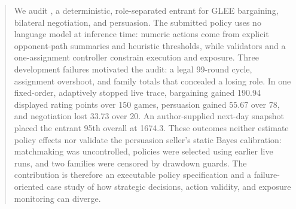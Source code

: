 \begin{abstract}
We audit \AgentName, a deterministic, role-separated entrant for GLEE
bargaining, bilateral negotiation, and persuasion. The submitted policy uses no
language model at inference time: numeric actions come from explicit
opponent-path summaries and heuristic thresholds, while validators and a
one-assignment controller constrain execution and exposure. Three development
failures motivated the audit: a legal 99-round cycle, assignment overshoot, and
family totals that concealed a losing role. In one fixed-order, adaptively
stopped live trace, bargaining gained 190.94 displayed rating points over 150
games, persuasion gained 55.67 over 78, and negotiation lost 33.73 over 20.
An author-supplied next-day snapshot placed the entrant 95th overall at 1674.3.
These outcomes neither estimate policy effects nor validate the persuasion
seller's static Bayes calibration: matchmaking was uncontrolled, policies were
selected using earlier live runs, and two families were censored by drawdown
guards. The contribution is therefore an executable policy specification and a
failure-oriented case study of how strategic decisions, action validity, and
exposure monitoring can diverge.
\end{abstract}
